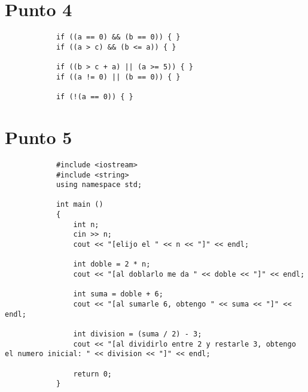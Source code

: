 \documentclass[10pt]{article}
\begin{document}
    
    \section*{Punto 4}
        \begin{verbatim}
            if ((a == 0) && (b == 0)) { }
            if ((a > c) && (b <= a)) { }
            
            if ((b > c + a) || (a >= 5)) { }
            if ((a != 0) || (b == 0)) { }
            
            if (!(a == 0)) { }
        \end{verbatim}
    
    
    \section*{Punto 5}
        \begin{verbatim}
            #include <iostream>
            #include <string>
            using namespace std;
            
            int main ()
            {
                int n;
                cin >> n;
                cout << "[elijo el " << n << "]" << endl;
            
                int doble = 2 * n;
                cout << "[al doblarlo me da " << doble << "]" << endl;
            
                int suma = doble + 6;
                cout << "[al sumarle 6, obtengo " << suma << "]" << endl;
                
                int division = (suma / 2) - 3;
                cout << "[al dividirlo entre 2 y restarle 3, obtengo el numero inicial: " << division << "]" << endl;
            
                return 0;
            }
        \end{verbatim}
\end{document}
